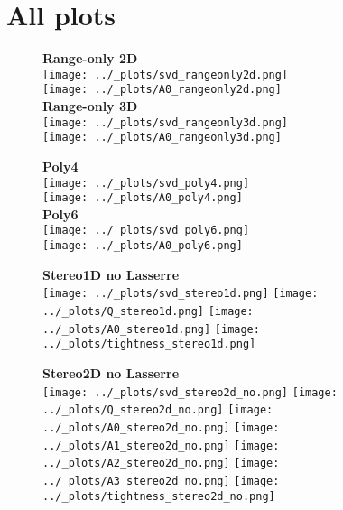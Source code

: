 \clearpage
\FloatBarrier
\section{All plots}

\begin{figure}[h!]
  \centering
  \textbf{\large{Range-only 2D}} \\
  \texttt{[image: ../\_plots/svd\_rangeonly2d.png]} \\
  \texttt{[image: ../\_plots/A0\_rangeonly2d.png]} \\
  \vspace{3em}
  \textbf{\large{Range-only 3D}} \\
  \texttt{[image: ../\_plots/svd\_rangeonly3d.png]} \\
  \texttt{[image: ../\_plots/A0\_rangeonly3d.png]} \\
\end{figure}
\begin{figure}[h!]
  \centering
  \textbf{\large{Poly4}} \\
  \texttt{[image: ../\_plots/svd\_poly4.png]} \\
  \texttt{[image: ../\_plots/A0\_poly4.png]} \\
  \vspace{3em}
  \textbf{\large{Poly6}} \\
  \texttt{[image: ../\_plots/svd\_poly6.png]} \\
  \texttt{[image: ../\_plots/A0\_poly6.png]} \\
\end{figure}

\begin{figure}[h!]
  \centering
  \textbf{\large{Stereo1D no Lasserre}} \\
  \vspace{2em}
  \texttt{[image: ../\_plots/svd\_stereo1d.png]}
  \texttt{[image: ../\_plots/Q\_stereo1d.png]}
  \texttt{[image: ../\_plots/A0\_stereo1d.png]}
  \texttt{[image: ../\_plots/tightness\_stereo1d.png]}
\end{figure}

\begin{figure}[h!]
  \centering
  \textbf{\large{Stereo2D no Lasserre}} \\
  \vspace{2em}
  \texttt{[image: ../\_plots/svd\_stereo2d\_no.png]}
  \texttt{[image: ../\_plots/Q\_stereo2d\_no.png]}
  \texttt{[image: ../\_plots/A0\_stereo2d\_no.png]}
  \texttt{[image: ../\_plots/A1\_stereo2d\_no.png]}
  \texttt{[image: ../\_plots/A2\_stereo2d\_no.png]}
  \texttt{[image: ../\_plots/A3\_stereo2d\_no.png]}
  \texttt{[image: ../\_plots/tightness\_stereo2d\_no.png]}
\end{figure}

